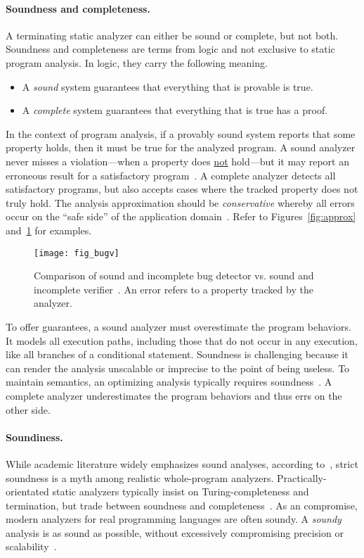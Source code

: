 \paragraph*{Soundness and completeness.}
A terminating static analyzer can either be sound or complete, but not both.
Soundness and completeness are terms from logic and not exclusive to static program analysis.
In logic, they carry the following meaning.
\begin{itemize}
\item A \emph{sound} system guarantees that everything that is provable is true.
\item A \emph{complete} system guarantees that everything that is true has a proof.
\end{itemize}
In the context of program analysis,
if a provably sound system reports that some property holds, then it must be true for the analyzed program.
A sound analyzer never misses a violation---\ie when a property does \underline{not} hold---but it may report an erroneous result for a satisfactory program~\cite{torlak2015}.
A complete analyzer detects all satisfactory programs, but also accepts cases where the tracked property does not truly hold.
The analysis approximation should be \emph{conservative}
whereby all errors occur on the \enquote{safe side} of the application domain~\cite[p. 5]{moller2023}.
Refer to Figures~\ref{fig:approx} and~\ref{fig:bug-verify} for examples.

\begin{figure}[h]
\centering
\texttt{[image: fig\_bugv]}
\caption[Sound and incomplete bug detector vs. verifier]{
Comparison of sound and incomplete bug detector vs. sound and incomplete verifier~\cite{moller2024}.
An error refers to a property tracked by the analyzer.}
\label{fig:bug-verify}
\end{figure}

To offer guarantees, a sound analyzer must overestimate the program behaviors.
It models all execution paths, including those that do not occur in any execution, like all branches of a conditional statement.
Soundness is challenging because it can render the analysis unscalable or imprecise to the point of being useless.
To maintain semantics, an optimizing analysis typically requires soundness~\cite[p. 5]{moller2023}.
A complete analyzer underestimates the program behaviors and thus errs on the other side.

\paragraph*{Soundiness.}
While academic literature widely emphasizes sound analyses, according to~\textcite{livshits2015}, strict soundness is a myth among realistic whole-program analyzers.
Practically-orientated static analyzers typically insist on Turing-completeness and termination,
but trade between soundness and completeness~\cite{moller2023,steffen2020}.
As an compromise, modern analyzers for real programming languages are often soundy.
A \emph{soundy} analysis is as sound as possible, without excessively compromising precision or scalability~\cite{livshits2015}.

